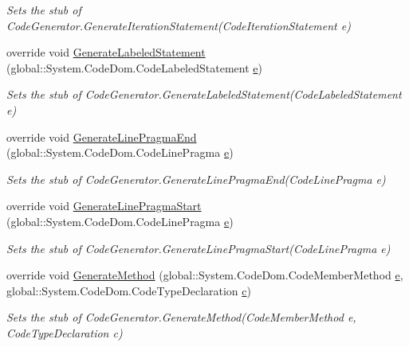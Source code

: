 \begin{DoxyCompactItemize}
\begin{DoxyCompactList}\small\item\em Sets the stub of Code\-Generator.\-Generate\-Iteration\-Statement(\-Code\-Iteration\-Statement e)\end{DoxyCompactList}\item 
override void \hyperlink{class_system_1_1_code_dom_1_1_compiler_1_1_fakes_1_1_stub_code_compiler_a6faecc77e0af1c5752f688642eaf4882}{Generate\-Labeled\-Statement} (global\-::\-System.\-Code\-Dom.\-Code\-Labeled\-Statement \hyperlink{jquery-1_810_82_8min_8js_a2c038346d47955cbe2cb91e338edd7e1}{e})
\begin{DoxyCompactList}\small\item\em Sets the stub of Code\-Generator.\-Generate\-Labeled\-Statement(\-Code\-Labeled\-Statement e)\end{DoxyCompactList}\item 
override void \hyperlink{class_system_1_1_code_dom_1_1_compiler_1_1_fakes_1_1_stub_code_compiler_a4b689b60bcee0dbcc3b63f8d0ba90611}{Generate\-Line\-Pragma\-End} (global\-::\-System.\-Code\-Dom.\-Code\-Line\-Pragma \hyperlink{jquery-1_810_82_8min_8js_a2c038346d47955cbe2cb91e338edd7e1}{e})
\begin{DoxyCompactList}\small\item\em Sets the stub of Code\-Generator.\-Generate\-Line\-Pragma\-End(\-Code\-Line\-Pragma e)\end{DoxyCompactList}\item 
override void \hyperlink{class_system_1_1_code_dom_1_1_compiler_1_1_fakes_1_1_stub_code_compiler_a7cc7ad12ab0626269a9e940d783a9ef2}{Generate\-Line\-Pragma\-Start} (global\-::\-System.\-Code\-Dom.\-Code\-Line\-Pragma \hyperlink{jquery-1_810_82_8min_8js_a2c038346d47955cbe2cb91e338edd7e1}{e})
\begin{DoxyCompactList}\small\item\em Sets the stub of Code\-Generator.\-Generate\-Line\-Pragma\-Start(\-Code\-Line\-Pragma e)\end{DoxyCompactList}\item 
override void \hyperlink{class_system_1_1_code_dom_1_1_compiler_1_1_fakes_1_1_stub_code_compiler_a496cb23f0716231b2c07e4e7e6a057bd}{Generate\-Method} (global\-::\-System.\-Code\-Dom.\-Code\-Member\-Method \hyperlink{jquery-1_810_82_8min_8js_a2c038346d47955cbe2cb91e338edd7e1}{e}, global\-::\-System.\-Code\-Dom.\-Code\-Type\-Declaration \hyperlink{bootstrap_8min_8js_abce695e0af988ece0826d9ad59b8160d}{c})
\begin{DoxyCompactList}\small\item\em Sets the stub of Code\-Generator.\-Generate\-Method(\-Code\-Member\-Method e, Code\-Type\-Declaration c)\end{DoxyCompactList}\item 

\end{DoxyCompactItemize}
